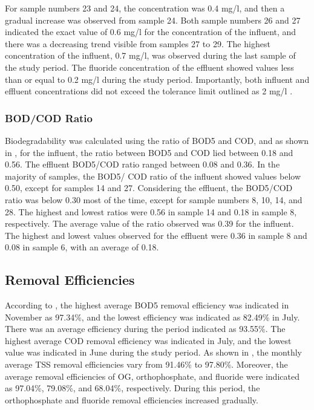 For sample numbers 23 and 24, the concentration was 0.4 mg/l, and then a gradual increase was observed from sample 24. Both sample numbers 26 and 27 indicated the exact value of 0.6 mg/l for the concentration of the influent, and there was a decreasing trend visible from samples 27 to 29. The highest concentration of the influent, 0.7 mg/l, was observed during the last sample of the study period. The fluoride concentration of the effluent showed values less than or equal to 0.2 mg/l during the study period. Importantly, both influent and effluent concentrations did not exceed the tolerance limit outlined as 2 mg/l \cite{CEA2022}.





\subsubsection{BOD/COD Ratio}
Biodegradability was calculated using the ratio of \ac{BOD5} and \ac{COD}, and as shown in , for the influent, the ratio between \ac{BOD5} and \ac{COD} lied between 0.18 and 0.56. The effluent \ac{BOD5}/\ac{COD} ratio ranged between 0.08 and 0.36. In the majority of samples, the \ac{BOD5}/ \ac{COD} ratio of the influent showed values below 0.50, except for samples 14 and 27. Considering the effluent, the \ac{BOD5}/\ac{COD} ratio was below 0.30 most of the time, except for sample numbers 8, 10, 14, and 28. The highest and lowest ratios were 0.56 in sample 14 and 0.18 in sample 8, respectively. The average value of the ratio observed was 0.39 for the influent. The highest and lowest values observed for the effluent were 0.36 in sample 8 and 0.08 in sample 6, with an average of 0.18. 


\subsection{Removal Efficiencies}
According to , the highest average \ac{BOD5} removal efficiency was indicated in November as 97.34\%, and the lowest efficiency was indicated as 82.49\% in July. There was an average efficiency during the period indicated as 93.55\%. The highest average \ac{COD} removal efficiency was indicated in July, and the lowest value was indicated in June during the study period. As shown in , the monthly average \ac{TSS} removal efficiencies vary from 91.46\% to 97.80\%. Moreover, the average removal efficiencies of \ac{OG}, orthophosphate, and fluoride were indicated as 97.04\%, 79.08\%, and 68.04\%, respectively. During this period, the orthophosphate and fluoride removal efficiencies increased gradually.

